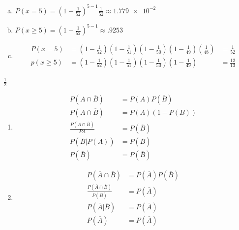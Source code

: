 \documentclass[12pt]{article}
\newenvironment{problem}[2][Problem]{\begin{trivlist}
\item[\hskip \labelsep {\bfseries #1}\hskip \labelsep {\bfseries #2.}]
  \vspace{1 cm}
}{\end{trivlist}}
\begin{document}
\begin{problem}{2.51}
\item
  \begin{enumerate}[a.]
    \item %
      $P(x=5) = (1-\frac{1}{52})^{5-1} \frac{1}{52} \approx \num{1.779e-2}$
    \item %
      $P(x\geq5) = (1-\frac{1}{52})^{5-1} \approx .9253$
    \item %
      \begin{align*}
        P(x=5)
        &= (1-\frac{1}{52})(1-\frac{1}{51})(1-\frac{1}{50})(1-\frac{1}{49})(\frac{1}{48})
        &= \frac{1}{52} \\
        p(x\geq5) 
        &=(1-\frac{1}{52})(1-\frac{1}{51})(1-\frac{1}{50})(1-\frac{1}{49})
        &= \frac{12}{13}
      \end{align*}
  \end{enumerate}
\end{problem}

\begin{problem}{2.53}
\item
  $\frac{1}{2}$
\end{problem}

\begin{problem}{2.55}
\item
  \begin{enumerate}
    \item %
      \begin{align*}
        P(A\cap \overline{B}) &= P(A)P(\overline{B}) \\
        P(A\cap \overline{B}) &= P(A)(1-P(B)) \\
        \frac{P(A\cap \overline{B})}{P{A}} &= P(\overline{B}) \\ 
        P(\overline{B}|P(A)) &= P(\overline{B}) \\ 
        P(\overline{B}) &= P(\overline{B}) 
      \end{align*}
    \item %
      \begin{align*}
        P(\overline{A} \cap \overline{B}) &= P(\overline{A})P(\overline{B}) \\
        \frac{P(\overline{A} \cap \overline{B})}{P(\overline{B})} &= P(\overline{A}) \\
        P(\overline{A}|\overline{B}) &= P(\overline{A}) \\
        P(\overline{A}) &= P(\overline{A})
      \end{align*}
  \end{enumerate}
\end{problem}
\end{document}
